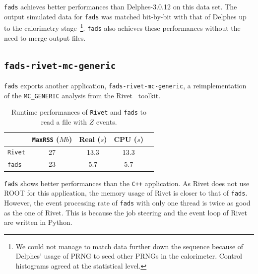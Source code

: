\documentclass[a4paper]{jpconf}
\begin{document}
\texttt{fads} achieves better performances than Delphes-3.0.12 on this data set.
The output simulated data for \texttt{fads} was matched bit-by-bit with that of Delphes up to the calorimetry stage~\footnote{We could not manage to match data further down the sequence because of Delphes' usage of PRNG to seed other PRNGs in the calorimeter. Control histograms agreed at the statistical level.}.
\texttt{fads} also achieves these performances without the need to merge output files.


\subsection{\texttt{fads-rivet-mc-generic}}

\texttt{fads} exports another application, \texttt{fads-rivet-mc-generic}, a reimplementation of the \texttt{MC\_GENERIC} analysis from the Rivet~\cite{ref-rivet} toolkit.

\begin{table}[h]
\begin{center}
  \begin{tabular}{ l | c | c | c | c }
	   & \texttt{MaxRSS} ($Mb$) & Real ($s$) & CPU ($s$) \\
    \hline
	   \texttt{Rivet} & 27 & 13.3 & 13.3 \\
	   \texttt{fads} & 23 & 5.7 & 5.7 \\
    \hline
  \end{tabular}
	\caption{\label{fig-rivet-perf-tab}Runtime performances of \texttt{Rivet} and \texttt{fads} to read a file with $Z$ events.}
\end{center}
\end{table}

\texttt{fads} shows better performances than the \texttt{C++} application.
As Rivet does not use ROOT for this application, the memory usage of Rivet is closer to that of \texttt{fads}.
However, the event processing rate of \texttt{fads} with only one thread is twice as good as the one of Rivet.
This is because the job steering and the event loop of Rivet are written in Python.
\end{document}
